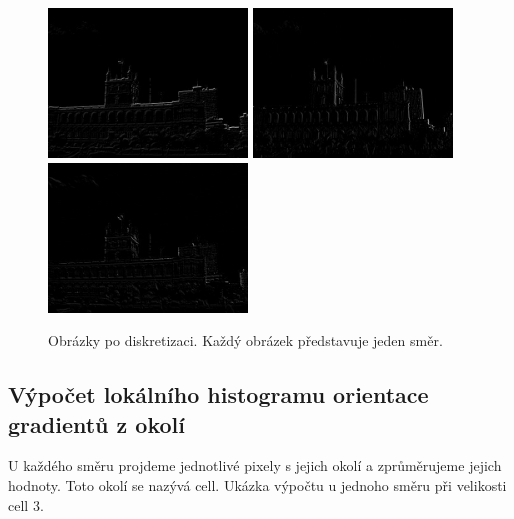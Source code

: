 \documentclass{report}
\begin{document}
\begin{figure}[ht]
	\centering
	\includegraphics[width=150pt]{./img/directional0.jpg}
	\includegraphics[width=150pt]{./img/directional1.jpg}
	\includegraphics[width=150pt]{./img/directional2.jpg}
	\caption{Obrázky po diskretizaci. Každý obrázek představuje jeden směr.}
\end{figure}


\subsection{Výpočet lokálního histogramu orientace gradientů z okolí}
U každého směru projdeme jednotlivé pixely s jejich okolí a zprůměrujeme jejich hodnoty. Toto okolí se nazývá cell. Ukázka výpočtu u jednoho směru při velikosti cell 3. 
\end{document}
